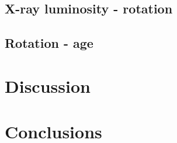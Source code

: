 \subsection{X-ray luminosity - rotation}

\subsection{Rotation - age}

\section{Discussion}


\section{Conclusions}


























